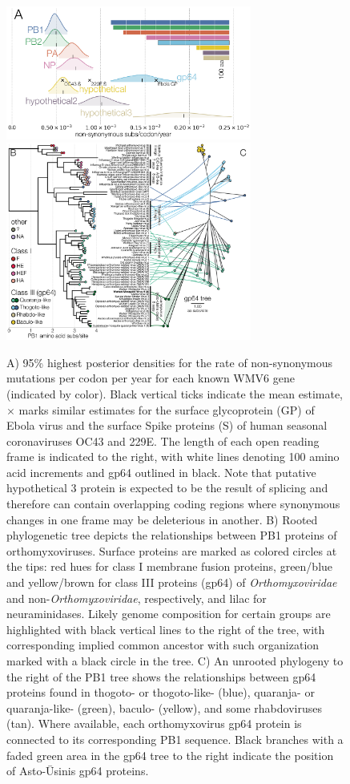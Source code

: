 \documentclass[11pt,twocolumn]{article}
\begin{document}
\begin{figure}%
\centering
\includegraphics[width=0.72\textwidth]{Fig2A_nsyn.png}
\includegraphics[width=0.72\textwidth]{Fig2BC_orthomyxos.png}

\caption{
A) 95\% highest posterior densities for the rate of non-synonymous mutations per codon per year for each known WMV6 gene (indicated by color).
Black vertical ticks indicate the mean estimate, $\times$ marks similar estimates for the surface glycoprotein (GP) of Ebola virus and the surface Spike proteins (S) of human seasonal coronaviruses OC43 and 229E.
The length of each open reading frame is indicated to the right, with white lines denoting 100 amino acid increments and gp64 outlined in black.
Note that putative hypothetical 3 protein is expected to be the result of splicing \citep{batson_single_2021} and therefore can contain overlapping coding regions where synonymous changes in one frame may be deleterious in another.
B) Rooted phylogenetic tree depicts the relationships between PB1 proteins of orthomyxoviruses.
Surface proteins are marked as colored circles at the tips: red hues for class I membrane fusion proteins, green/blue and yellow/brown for class III proteins (gp64) of \textit{Orthomyxoviridae} and non-\textit{Orthomyxoviridae}, respectively, and lilac for neuraminidases.
Likely genome composition for certain groups are highlighted with black vertical lines to the right of the tree, with corresponding implied common ancestor with such organization marked with a black circle in the tree.
C) An unrooted phylogeny to the right of the PB1 tree shows the relationships between gp64 proteins found in thogoto- or thogoto-like- (blue), quaranja- or quaranja-like- (green), baculo- (yellow), and some rhabdoviruses (tan).
Where available, each orthomyxovirus gp64 protein is connected to its corresponding PB1 sequence.
Black branches with a faded green area in the gp64 tree to the right indicate the position of Asto-\={U}sinis gp64 proteins.
}
\label{fig:orthomyxos}


\end{figure}
\end{document}
